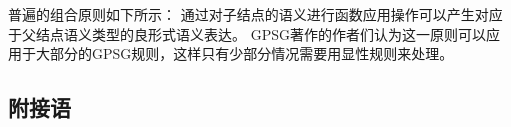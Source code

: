\noindent
普遍的组合原则如下所示：
\eanoraggedright
通过对子结点的语义进行函数应用操作可以产生对应于父结点语义类型的良形式语义表达。
\z
GPSG著作的作者们认为这一原则可以应用于大部分的GPSG规则，这样只有少部分情况需要用显性规则来处理。

\subsection{附接语}
\label{Abschnitt-Adjunkte-GPSG}


